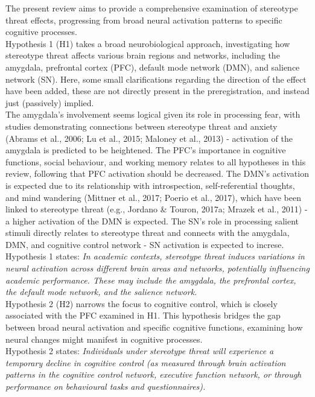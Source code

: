 \documentclass[
  stu, a4paper, 12pt,mask,floatsintext]{apa7}
\begin{document}
The present review aims to provide a comprehensive examination of stereotype threat effects, progressing from broad neural activation patterns to specific cognitive processes.\\
Hypothesis 1 (H1) takes a broad neurobiological approach, investigating how stereotype threat affects various brain regions and networks, including the amygdala, prefrontal cortex (PFC), default mode network (DMN), and salience network (SN).
Here, some small clarifications regarding the direction of the effect have been added, these are not directly present in the preregistration, and instead just (passively) implied.\\
The amygdala's involvement seems logical given its role in processing fear, with studies demonstrating connections between stereotype threat and anxiety (Abrams et al., 2006; Lu et al., 2015; Maloney et al., 2013) - activation of the amygdala is predicted to be heightened.
The PFC's importance in cognitive functions, social behaviour, and working memory relates to all hypotheses in this review, following that PFC activation should be decreased.
The DMN's activation is expected due to its relationship with introspection, self-referential thoughts, and mind wandering (Mittner et al., 2017; Poerio et al., 2017), which have been linked to stereotype threat (e.g., Jordano \& Touron, 2017a; Mrazek et al., 2011) - a higher activation of the DMN is expected.
The SN's role in processing salient stimuli directly relates to stereotype threat and connects with the amygdala, DMN, and cognitive control network - SN activation is expected to increse.\\
Hypothesis 1 states: \emph{In academic contexts, stereotype threat induces variations in neural activation across different brain areas and networks, potentially influencing academic performance. These may include the amygdala, the prefrontal cortex, the default mode network, and the salience network.}\\
Hypothesis 2 (H2) narrows the focus to cognitive control, which is closely associated with the PFC examined in H1.
This hypothesis bridges the gap between broad neural activation and specific cognitive functions, examining how neural changes might manifest in cognitive processes.\\
Hypothesis 2 states: \emph{Individuals under stereotype threat will experience a temporary decline in cognitive control (as measured through brain activation patterns in the cognitive control network, executive function network, or through performance on behavioural tasks and questionnaires).}
\end{document}
